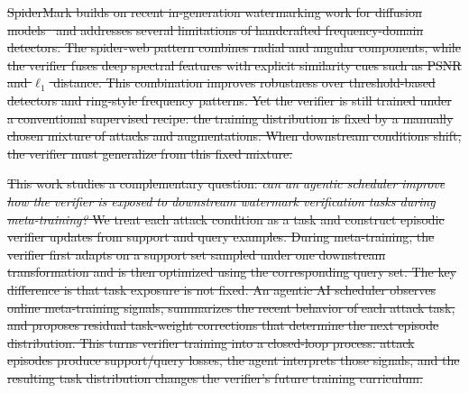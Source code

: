 \sout{
SpiderMark builds on recent in-generation watermarking work for diffusion
models~\cite{wen2023tree_ring,fernandez2023stable,yang2024gaussian,huang2024robin} and addresses several limitations of handcrafted frequency-domain detectors.
The spider-web pattern combines radial and angular components, while the verifier fuses deep spectral features with explicit similarity cues such as PSNR and $\ell_1$ distance.
This combination improves robustness over threshold-based detectors and ring-style frequency patterns.
Yet the verifier is still trained under a conventional supervised recipe: the training distribution is fixed by a manually chosen mixture of attacks and augmentations.
When downstream conditions shift, the verifier must generalize from this fixed mixture.}

\sout{
This work studies a complementary question:
\emph{can an agentic scheduler improve how the verifier is exposed to downstream watermark verification tasks during meta-training?}
We treat each attack condition as a task and construct episodic verifier updates from support and query examples.
During meta-training, the verifier first adapts on a support set sampled under one downstream transformation and is then optimized using the corresponding query set.
The key difference is that task exposure is not fixed.
An agentic AI scheduler observes online meta-training signals, summarizes the recent behavior of each attack task, and proposes residual task-weight corrections that determine the next episode distribution.
This turns verifier training into a closed-loop process: attack episodes produce support/query losses, the agent interprets those signals, and the resulting task distribution changes the verifier's future training curriculum. }

